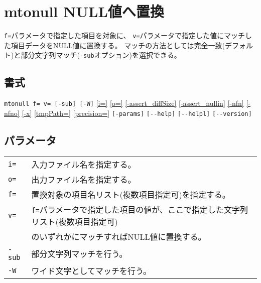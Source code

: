 
%

\section{mtonull NULL値へ置換\label{sect:mtonull}}
\verb|f=|パラメータで指定した項目を対象に、
\verb|v=|パラメータで指定した値にマッチした項目データをNULL値に置換する。
マッチの方法としては完全一致(デフォルト)と部分文字列マッチ(\verb|-sub|オプション)を選択できる。

\subsection*{書式}
\verb|mtonull f= v= [-sub] [-W]|
\hyperref[sect:option_i]{[i=]}
\hyperref[sect:option_o]{[o=]}
\hyperref[sect:option_assert_diffSize]{[-assert\_diffSize]}
\hyperref[sect:option_assert_nullin]{[-assert\_nullin]}
\hyperref[sect:option_nfn]{[-nfn]} 
\hyperref[sect:option_nfno]{[-nfno]}  
\hyperref[sect:option_x]{[-x]}
\hyperref[sect:option_option_tmppath]{[tmpPath=]}
\hyperref[sect:option_precision]{[precision=]}
\verb|[-params]|
\verb|[--help]|
\verb|[--helpl]|
\verb|[--version]|\\

\subsection*{パラメータ}
\begin{table}[htbp]
{\small
\begin{tabular}{ll}
\verb|i=|    & 入力ファイル名を指定する。\\
\verb|o=|    & 出力ファイル名を指定する。\\
\verb|f=|  & 置換対象の項目名リスト(複数項目指定可)を指定する。\\
\verb|v=|  & \verb|f=|パラメータで指定した項目の値が、ここで指定した文字列リスト(複数項目指定可)\\
           & のいずれかにマッチすればNULL値に置換する。\\
\verb|-sub| & 部分文字列マッチを行う。\\
\verb|-W|  & ワイド文字としてマッチを行う。\\
\end{tabular} 
}
\end{table} 

